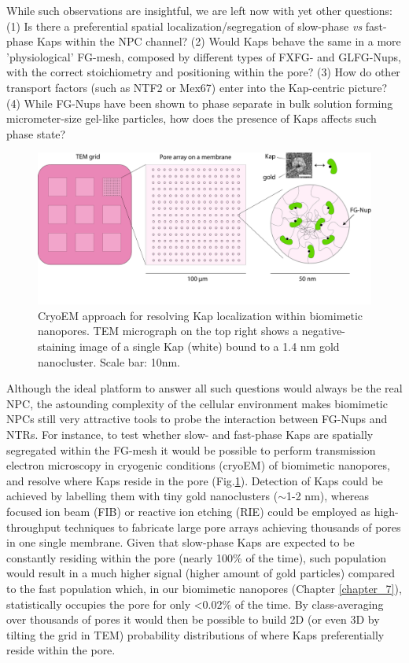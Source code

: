 While such observations are insightful, we are left now with yet other questions: (1) Is there a preferential spatial  localization/segregation of slow-phase \emph{vs} fast-phase Kaps within the NPC channel? (2) Would Kaps behave the same in a more 'physiological' FG-mesh, composed by different types of FXFG- and GLFG-Nups, with the correct stoichiometry and positioning within the pore? (3) How do other transport factors (such as NTF2 or Mex67) enter into the Kap-centric picture? (4) While FG-Nups have been shown to phase separate in bulk solution forming micrometer-size gel-like particles, how does the presence of Kaps affects such phase state? 
\begin{figure}[!htbp]
	\centering
	\includegraphics[width=1\linewidth]{figures/Figure8.3.pdf}
	\caption{CryoEM approach for resolving Kap localization within biomimetic nanopores. TEM micrograph on the top right shows a negative-staining image of a single Kap (white) bound to a 1.4 nm gold nanocluster. Scale bar: 10nm.}
	\label{fig:fig8.3}
\end{figure}
Although the ideal platform to answer all such questions would always be the real NPC, the astounding complexity of the cellular environment makes biomimetic NPCs still very attractive tools to probe the interaction between FG-Nups and NTRs. For instance, to test whether slow- and fast-phase Kaps are spatially segregated within the FG-mesh it would be possible to perform transmission electron microscopy in cryogenic conditions (cryoEM) of biomimetic nanopores, and resolve where Kaps reside in the pore (Fig.\ref{fig:fig8.3}). Detection of Kaps could be achieved by labelling them with tiny gold nanoclusters ($\sim$1-2 nm), whereas focused ion beam (FIB) \cite{Lanyon2007} or reactive ion etching (RIE) \cite{Verschueren2018} could be employed as high-throughput techniques to fabricate large pore arrays achieving thousands of pores in one single membrane. Given that slow-phase Kaps are expected to be constantly residing within the pore (nearly 100\% of the time), such population would result in a much higher signal (higher amount of gold particles) compared to the fast population which, in our biomimetic nanopores (Chapter \ref{chapter_7}), statistically occupies the pore for only <0.02\% of the time. By class-averaging over thousands of pores it would then be possible to build 2D (or even 3D by tilting the grid in TEM) probability distributions of where Kaps preferentially reside within the pore.

